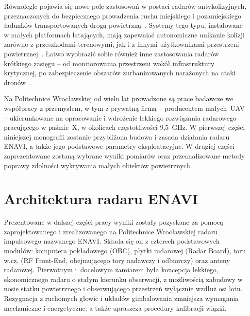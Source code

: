 Równolegle pojawia się nowe pole zastosowań w postaci radarów antykolizyjnych, przeznaczonych do bezpiecznego prowadzenia ruchu miejskiego i pozamiejskiego ładunków transportowanych drogą powietrzną~\cite{UAVsenseAndAvoid2017,AutomotiveRadarOverview2019}. Systemy tego typu, instalowane w małych platformach latających, mają zapewniać autonomiczne unikanie kolizji zarówno z przeszkodami terenowymi, jak i z innymi użytkownikami przestrzeni powietrznej~\cite{UAVsenseAndAvoid2017}. Łatwo wyobrazić sobie również inne zastosowania radarów krótkiego zasięgu -- od monitorowania przestrzeni wokół infrastruktury krytycznej, po zabezpieczenie obszarów zurbanizowanych narażonych na ataki dronów~\cite{AutomotiveRadarOverview2019,CUASsurvey2021}.

Na Politechnice Wrocławskiej od wielu lat prowadzone są prace badawcze we współpracy z przemysłem, w tym z prywatną firmą -- producentem małych~UAV -- ukierunkowane na opracowanie i wdrożenie lekkiego rozwiązania radarowego pracującego w paśmie~X, w okolicach częstotliwości 9{,}5~GHz. W pierwszej części niniejszej monografii zostanie przybliżona budowa i zasada działania radaru ENAVI, a także jego podstawowe parametry eksploatacyjne. W drugiej części zaprezentowane zostaną wybrane wyniki pomiarów oraz przeanalizowane metody poprawy zdolności wykrywania małych obiektów powietrznych.

\section{Architektura radaru ENAVI}

Prezentowane w dalszej części pracy wyniki zostały pozyskane za pomocą zaprojektowanego i zrealizowanego na Politechnice Wrocławskiej radaru impulsowego nazwanego ENAVI. Składa się on z czterech podstawowych modułów: komputera pokładowego (OBC), płytki radarowej (Radar Board), toru w.cz. (RF Front-End, obejmującego tory nadawczy i odbiorczy) oraz anteny radarowej. 
Pierwotnym i~docelowym zamiarem była koncepcja lekkiego, ekonomicznego radaru o stałym kierunku obserwacji, z możliwością zabudowy w nosie statku powietrznego i obserwującego przestrzeń wyłącznie wzdłuż osi lotu. 
Rezygnacja z ruchomych głowic i układów gimbalowania zmniejsza wymagania mechaniczne i energetyczne, a także upraszcza procedury kalibracji wiązki.

